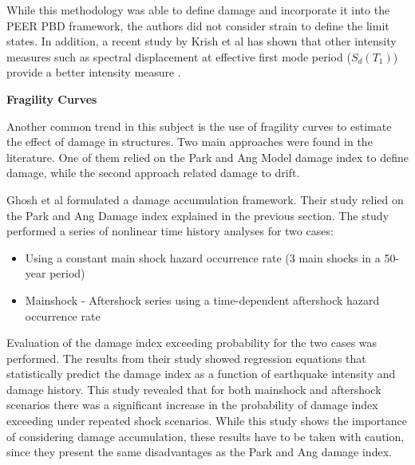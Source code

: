While this methodology was able to define damage and incorporate it into the PEER PBD framework, the authors did not consider  strain to define the limit states. In addition, a recent study by Krish et al has shown that other intensity measures such as spectral displacement at effective first mode period ($S_{d}(T_{1})$) provide a better intensity measure \cite{Krish2018}.

\textbf{Fragility Curves}

Another common trend in this subject is the use of fragility curves to estimate the effect of damage in structures. Two main approaches were found in the literature. One of them relied on the Park and Ang Model damage index to define damage, while the second approach related damage to drift.

Ghosh et al \cite{Ghosh2015} formulated a damage accumulation framework. Their study relied on the Park and Ang Damage index explained in the previous section. The study performed a series of nonlinear time history analyses for two cases:

\begin{itemize}
	\item Using a constant main shock hazard occurrence rate (3 main shocks in a 50-year period)
	\item Mainshock - Aftershock series using a time-dependent aftershock hazard occurrence rate
\end{itemize}

Evaluation of the damage index exceeding probability for the two cases was performed. The results from their study showed regression equations that statistically predict the damage index as a function of earthquake intensity and damage history. This study revealed that for both mainshock and aftershock scenarios there was a significant increase in the probability of damage index exceeding under repeated shock scenarios. While this study shows the importance of considering damage accumulation, these results have to be taken with caution, since they present the same disadvantages as the Park and Ang damage index.

